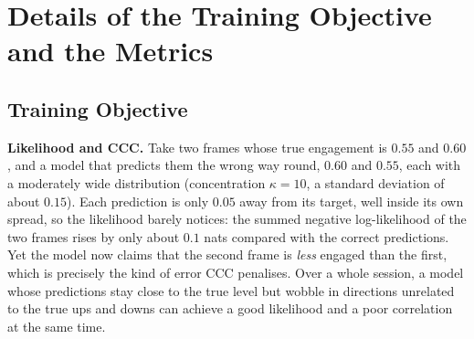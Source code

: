 \documentclass[10pt,a4paper,twocolumn]{article}
\begin{document}
	\section{Details of the Training Objective and the Metrics}
	\label{app:objective}
	\subsection*{Training Objective}
	\textbf{Likelihood and CCC.} Take two frames whose true engagement is $0.55$ and $0.60$, and a model that predicts them the wrong way round, $0.60$ and $0.55$, each with a moderately wide distribution (concentration $\kappa = 10$, a standard deviation of about $0.15$). Each prediction is only $0.05$ away from its target, well inside its own spread, so the likelihood barely notices: the summed negative log-likelihood of the two frames rises by only about $0.1$ nats compared with the correct predictions. Yet the model now claims that the second frame is \emph{less} engaged than the first, which is precisely the kind of error CCC penalises. Over a whole session, a model whose predictions stay close to the true level but wobble in directions unrelated to the true ups and downs can achieve a good likelihood and a poor correlation at the same time.
\end{document}
